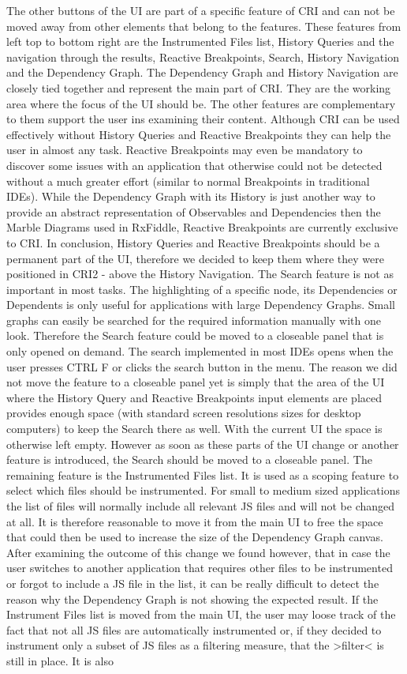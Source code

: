 The other buttons of the UI are part of a specific feature of CRI and can not be moved away from other elements that belong to the features. These features from left top to bottom right are the Instrumented Files list, History Queries and the navigation through the results, Reactive Breakpoints, Search, History Navigation and the Dependency Graph. The Dependency Graph and History Navigation are closely tied together and represent the main part of CRI. They are the working area where the focus of the UI should be. The other features are complementary to them support the user ins examining their content. Although CRI can be used effectively without History Queries and Reactive Breakpoints they can help the user in almost any task. Reactive Breakpoints may even be mandatory to discover some issues with an application that otherwise could not be detected without a much greater effort (similar to normal Breakpoints in traditional IDEs). While the Dependency Graph with its History is just another way to provide an abstract representation of Observables and Dependencies then the Marble Diagrams used in RxFiddle, Reactive Breakpoints are currently exclusive to CRI. In conclusion, History Queries and Reactive Breakpoints should be a permanent part of the UI, therefore we decided to keep them where they were positioned in CRI2 - above the History Navigation. The Search feature is not as important in most tasks. The highlighting of a specific node, its Dependencies or Dependents is only useful for applications with large Dependency Graphs. Small graphs can easily be searched for the required information manually with one look. Therefore the Search feature could be moved to a closeable panel that is only opened on demand. The search implemented in most IDEs opens when the user presses CTRL F or clicks the search button in the menu. The reason we did not move the feature to a closeable panel yet is simply that the area of the UI where the History Query and Reactive Breakpoints input elements are placed provides enough space (with standard screen resolutions sizes for desktop computers) to keep the Search there as well. With the current UI the space is otherwise left empty. However as soon as these parts of the UI change or another feature is introduced, the Search should be moved to a closeable panel. The remaining feature is the Instrumented Files list. It is used as a scoping feature to select which files should be instrumented. For small to medium sized applications the list of files will normally include all relevant JS files and will not be changed at all. It is therefore reasonable to move it from the main UI to free the space that could then be used to increase the size of the Dependency Graph canvas. After examining the outcome of this change we found however, that in case the user switches to another application that requires other files to be instrumented or forgot to include a JS file in the list, it can be really difficult to detect the reason why the Dependency Graph is not showing the expected result. If the Instrument Files list is moved from the main UI, the user may loose track of the fact that not all JS files are automatically instrumented or, if they decided to instrument only a subset of JS files as a filtering measure, that the >filter< is still in place. It is also 